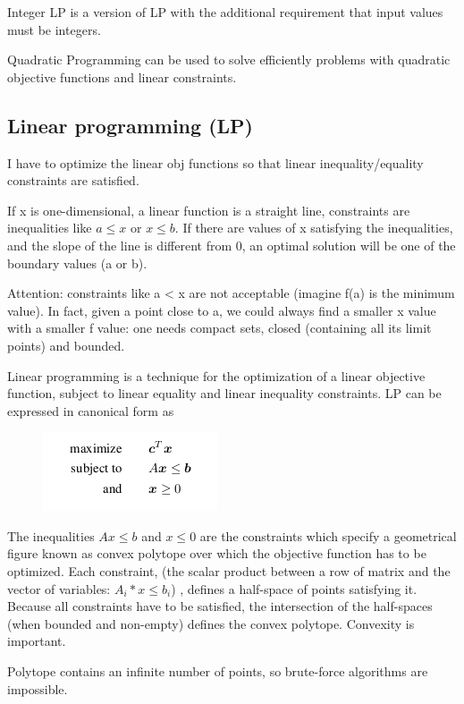 \documentclass[11pt]{article}
\begin{document}
Integer LP is a version of LP with the additional requirement that input values must be integers. 

Quadratic Programming can be used to solve efficiently problems with quadratic objective functions and linear constraints.

\subsection{Linear programming (LP)}
I have to optimize the linear obj functions so that linear inequality/equality constraints are satisfied. 

If x is one-dimensional, a linear function is a straight line, constraints are inequalities like $ a \leq x $ or $ x \leq b $. If there are values of x satisfying the inequalities, and the slope of the line is different from 0, an optimal solution will be one of the boundary values (a or b). 

Attention: constraints like a < x are not acceptable (imagine f(a) is the minimum value). In fact, given a point close to a, we could always find a smaller x value with a smaller f value: one needs compact sets, closed (containing all its limit points) and bounded.

Linear programming is a technique for the optimization of a linear
objective function, subject to linear equality and linear inequality constraints. LP can be expressed in canonical form
as

\begin{figure}[H]
\includegraphics[scale=0.50]{lp}
\centering
\end{figure}

The inequalities $ Ax \leq b $ and $ x \leq 0 $ are the constraints which specify a geometrical figure known as convex polytope over which the objective function has to be optimized.
Each constraint, (the scalar product between a row of matrix and the vector of variables: $ A_i * x \leq b_i $) , defines a half-space of points satisfying it. Because all constraints have to be satisfied, the intersection of the half-spaces (when bounded and non-empty) defines the convex polytope. Convexity is important.

Polytope contains an infinite number of points, so brute-force algorithms are impossible.
\end{document}
